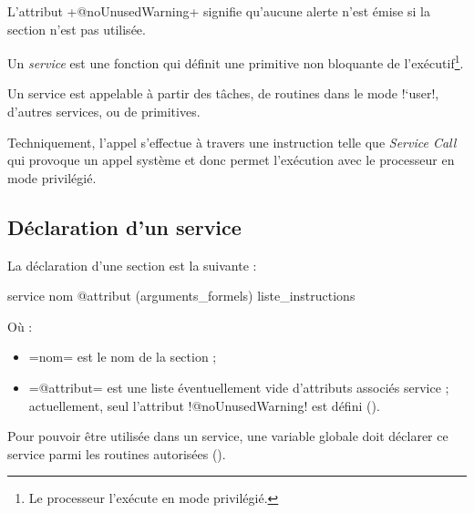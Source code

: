 L'attribut \plm+@noUnusedWarning+ signifie qu'aucune alerte n'est émise si la section n'est pas utilisée.




















Un \emph{service} est une fonction qui définit une primitive non bloquante de l'exécutif\footnote{Le processeur l'exécute en mode privilégié.}.

Un service est appelable à partir des tâches, de routines dans le mode \plm!`user!, d'autres services, ou de primitives.

Techniquement, l'appel s'effectue à travers une instruction telle que \emph{Service Call} qui provoque un appel système et donc permet l'exécution avec le processeur en mode privilégié.



\subsection{Déclaration d'un service}


La déclaration d'une section est la suivante :
\begin{PLM}
service nom @attribut (arguments_formels) {
  liste_instructions
}
\end{PLM}
Où :
\begin{itemize}
  \item \plm=nom= est le nom de la section ;
  \item \plm=@attribut= est une liste éventuellement vide d'attributs associés service ; actuellement, seul l'attribut \plm!@noUnusedWarning! est défini ().
\end{itemize}




Pour pouvoir être utilisée dans un service, une variable globale doit déclarer ce service parmi les routines autorisées ().



